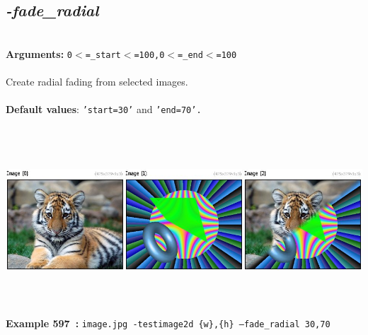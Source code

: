 \documentclass[a4paper,11pt,twoside]{book}
\begin{document}
\subsection{\emph{-fade\_radial} }\vspace*{-0.5em}
~\\\textbf{Arguments: } 
{\small \texttt{0$<$=\_start$<$=100,0$<$=\_end$<$=100}}\\~\\
Create radial fading from selected images.
~\\~\\\textbf{Default values}: {\small \texttt{'start=30'} and \texttt{'end=70'.}}
\begin{center}\includegraphics[keepaspectratio=true,height=7cm,width=\textwidth]{img/gmic_def597.jpg}\\
{\footnotesize \textbf{Example 597~:} \texttt{image.jpg -testimage2d \{w\},\{h\} --fade\_radial 30,70}}
\end{center}
\end{document}
